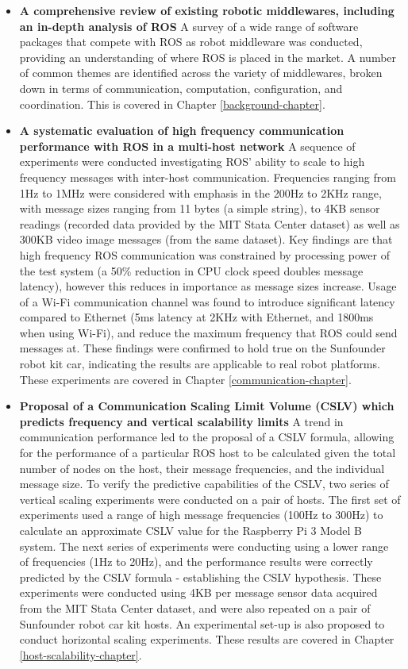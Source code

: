 \documentclass[../dissertation.tex]{subfiles}
\begin{document}
\begin{itemize}

  \item \textbf{A comprehensive review of existing robotic middlewares, including an in-depth analysis of ROS} A survey of a wide range of software packages that compete with ROS as robot middleware was conducted, providing an understanding of where ROS is placed in the market. A number of common themes are identified across the variety of middlewares, broken down in terms of communication, computation, configuration, and coordination. This is covered in Chapter \ref{background-chapter}.

  \item \textbf{A systematic evaluation of high frequency communication performance with ROS in a multi-host network} A sequence of experiments were conducted investigating ROS' ability to scale to high frequency messages with inter-host communication. Frequencies ranging from 1Hz to 1MHz were considered with emphasis in the 200Hz to 2KHz range, with message sizes ranging from 11 bytes (a simple string), to 4KB sensor readings (recorded data provided by the MIT Stata Center dataset\cite{mit-stata-center-dataset}) as well as 300KB video image messages (from the same dataset). Key findings are that high frequency ROS communication was constrained by processing power of the test system (a 50\% reduction in CPU clock speed doubles message latency), however this reduces in importance as message sizes increase. Usage of a Wi-Fi communication channel was found to introduce significant latency compared to Ethernet (5ms latency at 2KHz with Ethernet, and 1800ms when using Wi-Fi), and reduce the maximum frequency that ROS could send messages at. These findings were confirmed to hold true on the Sunfounder robot kit car, indicating the results are applicable to real robot platforms. These experiments are covered in Chapter \ref{communication-chapter}.

  \item \textbf{Proposal of a Communication Scaling Limit Volume (CSLV) which predicts frequency and vertical scalability limits} A trend in communication performance led to the proposal of a CSLV formula, allowing for the performance of a particular ROS host to be calculated given the total number of nodes on the host, their message frequencies, and the individual message size. To verify the predictive capabilities of the CSLV, two series of vertical scaling experiments were conducted on a pair of hosts. The first set of experiments used a range of high message frequencies (100Hz to 300Hz) to calculate an approximate CSLV value for the Raspberry Pi 3 Model B system. The next series of experiments were conducting using a lower range of frequencies (1Hz to 20Hz), and the performance results were correctly predicted by the CSLV formula - establishing the CSLV hypothesis. These experiments were conducted using 4KB per message sensor data acquired from the MIT Stata Center dataset\cite{mit-stata-center-dataset}, and were also repeated on a pair of Sunfounder robot car kit hosts. An experimental set-up is also proposed to conduct horizontal scaling experiments. These results are covered in Chapter \ref{host-scalability-chapter}.

\end{itemize}
\end{document}
